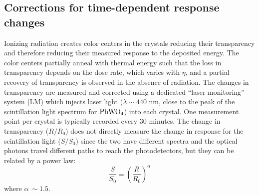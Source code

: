 \documentclass[journal]{IEEEtran}
\begin{document}
\subsection{Corrections for time-dependent response changes}
\label{sec:timedependence}
Ionizing radiation creates color centers in the crystals reducing their transparency and therefore reducing their measured response to the deposited energy. The color centers partially anneal with thermal energy such that the loss in transparency depends on the dose rate, which varies with $\eta$, and a partial recovery of transparency is observed in the absence of radiation. The changes in transparency are measured and corrected using a dedicated ``laser monitoring'' system \cite{Anfreville:2007zz} (LM) which injects laser light ($\lambda \sim 440$ nm, close to the peak of the scintillation light spectrum for $\rm PbWO_4$) into each crystal. One measurement point per crystal is typically recorded every 30 minutes. The change in transparency ($R/R_0$) does not directly measure the change in response for the scintillation light ($S/S_0$) since the two have different spectra and the optical photons travel different paths to reach the photodetectors, but they can be related by a power law:
\begin{equation}
\label{eqn:alpha}
\frac{S}{S_0} = \left(\frac{R}{R_0}\right)^\alpha
\end{equation}
where $\alpha ~\sim 1.5$.
\end{document}
